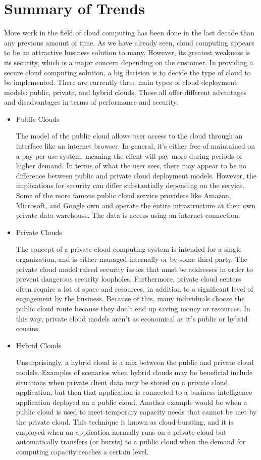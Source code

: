 \documentclass[a4paper, 8pt]{article} %
\begin{document}
\section*{Summary of Trends}

More work in the field of cloud computing has been done in the last decade than any previous amount of time.  As we have already seen, cloud computing appears to be an attractive business solution to many.  However, its greatest weakness is its security, which is a major concern depending on the customer.  In providing a secure cloud computing solution, a big decision is to decide the type of cloud to be implemented.  There are currently three main types of cloud deployment models: public, private, and hybrid clouds.  These all offer different advantages and disadvantages in terms of performance and security.  
\begin{itemize}
\item Public Clouds

The model of the public cloud allows user access to the cloud through an interface like an internet browser.  In general, it's either free of maintained on a pay-per-use system, meaning the client will pay more during periods of higher demand.  In terms of what the user sees, there may appear to be no difference between public and private cloud deployment models.  However, the implications for security can differ substantially depending on the service.  Some of the more famous public cloud service providers like Amazon, Microsoft, and Google own and operate the entire infrastructure at their own private data warehouse.  The data is access using an internet connection.  

\item Private Clouds

The concept of a private cloud computing system is intended for a single organization, and is either managed internally or by some third party.  The private cloud model raised security issues that must be addresses in order to prevent dangerous security loopholes.  Furthermore, private cloud centers often require a lot of space and resources, in addition to a significant level of engagement by the business.  Because of this, many individuals choose the public cloud route because they don't end up saving money or resources.  In this way, private cloud models aren't as economical as it's public or hybrid cousins.  

\item Hybrid Clouds

Unsurprisingly, a hybrid cloud is a mix between the public and private cloud models.  Examples of scenarios when hybrid clouds may be beneficial include situations when private client data may be stored on a private cloud application, but then that application is connected to a business intelligence application deployed on a public cloud.  Another example would be when a public cloud is used to meet temporary capacity needs that cannot be met by the private cloud.  This technique is known as cloud-bursting, and it is employed when an application normally runs on a private cloud but automatically transfers (or bursts) to a public cloud when the demand for computing capacity reaches a certain level.  


\end{itemize}
\end{document}
